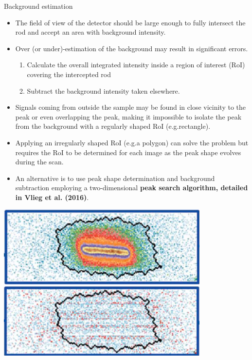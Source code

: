 \begin{frame}{Background estimation}

    \begin{itemize}
        \item The field of view of the detector should be large enough to fully intersect the rod and accept an area with background intensity.
        \item Over (or under)-estimation of the background may result in significant errors.
        \begin{enumerate}
            \item Calculate the overall integrated intensity inside a region of interest (RoI) covering the intercepted rod
            \item Subtract the background intensity taken elsewhere.
        \end{enumerate}
        \item Signals coming from outside the sample may be found in close vicinity to the peak or even overlapping the peak, making it impossible to isolate the peak from the background with a regularly shaped RoI (e.g.rectangle).
        \item Applying an irregularly shaped RoI (e.g.a polygon) can solve the problem but requires the RoI to be determined for each image as the peak shape evolves during the scan.
        \item An alternative is to use peak shape determination and background subtraction employing a two-dimensional \textbf{peak search algorithm, detailed in Vlieg et al. (2016)}.
    \end{itemize}

    \centering
    \includegraphics[height=0.25\textheight]{Figures/sxrd_data/SXRD_peak.png}
    \includegraphics[height=0.25\textheight]{Figures/sxrd_data/SXRD_peak_background.png}
        
\end{frame}


